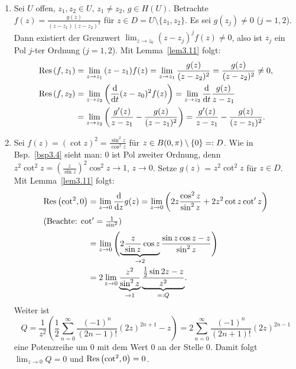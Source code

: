 \documentclass[a4paper,twoside,DIV15,BCOR12mm]{scrbook}
\begin{document}
\begin{bsp} \label{bsp3.12}
  \begin{enumerate}
  \item Sei $U$ offen, $z_1,z_2\in U$, $z_1\neq z_2$, $g\in H(U)$. Betrachte $f(z)=\frac{g(z)}{(z-z_1)(z-z_2)^2}$ für $z\in
    D=U\setminus\{z_1,z_2\}$. Es sei $g(z_j)\neq0$ ($j=1,2$). Dann existiert der Grenzwert $\lim_{z\to z_0}{(z-z_j)^j
      f(z)}\neq0$, also ist $z_j$ ein Pol $j$-ter Ordnung ($j=1,2$). Mit Lemma~\ref{lem3.11} folgt:
    \begin{align*}
      \mathrm{Res}\left(f,z_1\right) &= \lim_{z\to z_1}{(z-z_1)f(z)} = \lim_{z\to z_1}{\frac{g(z)}{(z-z_2)^2}} = \frac{g(z)}{(z-z_2)^2} \neq 0,\\
      \mathrm{Res}\left(f,z_2\right) &= \lim_{z\to z_2}{\left(\frac{\mathrm{d}}{\mathrm{d} t} (z-z_0)^2f(z) \right)}
                    = \lim_{z\to z_2}{\frac{\mathrm{d}}{\mathrm{d} t} \frac{g(z)}{z-z_1}}\\
                   &= \lim_{z\to z_2}{\left(\frac{g^\prime(z)}{z-z_1}-\frac{g(z)}{(z-z_1)^2}\right)}
                    = \frac{g^\prime(z)}{z-z_1}-\frac{g(z)}{(z-z_1)^2}.
    \end{align*}
  \item Sei $f(z)=(\cot{z})^2 = \frac{\sin^2{z}}{\cos^2{z}}$ für $z\in B(0,\pi)\setminus\{0\} =: D$. Wie in Bsp.~\ref{bsp3.4}
    sieht man: $0$ ist Pol zweiter Ordnung, denn $z^2\cot^2{z} = \left(\frac{z}{\sin{z}}\right)^2\cos^2{z} \to 1$,
    $z\to0$. Setze $g(z)$ = $z^2\cot^2{z}$ für $z\in D$. Mit Lemma~\ref{lem3.11} folgt:
    \begin{align*}
      \mathrm{Res}\left(\cot^2,0\right) &= \lim_{z\to0}{\frac{\mathrm{d}}{\mathrm{d} z}g(z)} = \lim_{z\to0}{\left(2z\frac{\cos^2{z}}{\sin^2{z}} +
          2z^2\cot{z}\cot^\prime{z}\right)}\\
        \intertext{(Beachte: $\cot^\prime = \frac{1}{\sin^2}$) }
        &= \lim_{z\to0}{\Biggl(\underbrace{2\frac{z}{\sin{z}}\cos{z}}_{\to2} \frac{\sin{z}\cos{z}-z}{\sin^2{z}}\Biggr)} \\
        &= 2 \lim_{z\to0}{\underbrace{\frac{z^2}{\sin^2{z}}}_{\to1}\underbrace{\frac{\frac12\sin{2z}-z}{z^2}}_{=: Q}}.
    \end{align*}
    Weiter ist
    \[ Q = \frac{1}{z^2} \left( \frac12 \sum_{n=0}^\infty{\frac{(-1)^n}{(2n-1)!}(2z)^{2n+1}} - z \right) =
    2 \sum_{n=0}^\infty{\frac{(-1)^n}{(2n+1)!}(2z)^{2n-1}} \]
    eine Potenzreihe um $0$ mit dem Wert $0$ an der Stelle $0$. Damit folgt $\displaystyle\lim_{z\to0}{Q}=0$ und
    $\mathrm{Res}\left(\cot^2,0\right) = 0$.
  \end{enumerate}
\end{bsp}
\end{document}
